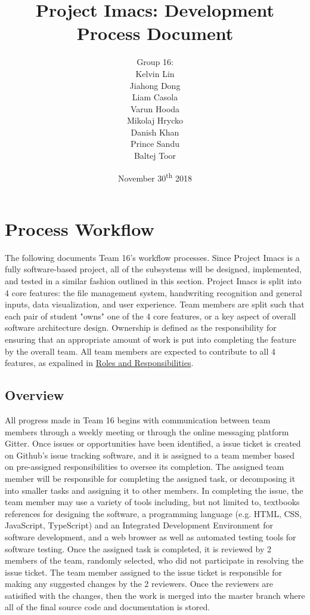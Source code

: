 \documentclass{article}
\title{Project Imacs: Development Process Document}
\author{Group 16:\\ Kelvin Lin\\ Jiahong Dong\\ Liam Casola\\ Varun Hooda\\ Mikolaj Hrycko\\ Danish Khan\\ Prince Sandu\\ Baltej Toor}
\date{November 30\textsuperscript{th} 2018}
\begin{document}
\maketitle
\newpage
\tableofcontents
\newpage

\section{Process Workflow}
\label{sec:process-workflow}
The following documents Team 16's workflow processes. Since Project Imacs is a fully software-based project, all of the subsystems will be designed, implemented, and tested in a similar fashion outlined in this section. Project Imacs is split into 4 core features: the file management system, handwriting recognition and general inputs, data visualization, and user experience. Team members are split such that each pair of student "owns" one of the 4 core features, or a key aspect of overall software architecture design. Ownership is defined as the responsibility for ensuring that an appropriate amount of work is put into completing the feature by the overall team. All team members are expected to contribute to all 4 features, as expalined in \hyperref[sec:roles-responsibilities]{Roles and Responsibilities}.

\subsection{Overview}
\label{sec:process-overview}
All progress made in Team 16 begins with communication between team members through a weekly meeting or through the online messaging platform Gitter. Once issues or opportunities have been identified, a issue ticket is created on Github's issue tracking software, and it is assigned to a team member based on pre-assigned responsibilities to oversee its completion. The assigned team member will be responsible for completing the assigned task, or decomposing it into smaller tasks and assigning it to other members. In completing the issue, the team member may use a variety of tools including, but not limited to, textbooks references for designing the software, a programming language (e.g. HTML, CSS, JavaScript, TypeScript) and an Integrated Development Environment for software development, and a web browser as well as automated testing tools for software testing. Once the assigned task is completed, it is reviewed by 2 members of the team, randomly selected, who did not participate in resolving the issue ticket. The team member assigned to the issue ticket is responsible for making any suggested changes by the 2 reviewers. Once the reviewers are satisified with the changes, then the work is merged into the master branch where all of the final source code and documentation is stored.
\end{document}
